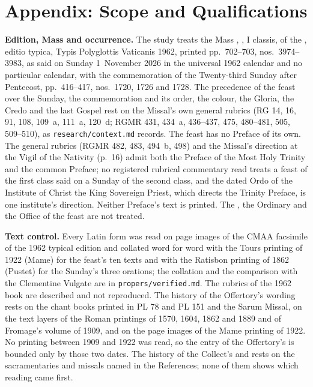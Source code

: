 \section{Appendix: Scope and Qualifications}
\label{sec:scope}

{\small
\textbf{Edition, Mass and occurrence.} The study treats the Mass
, , I classis, of the
, editio typica, Typis Polyglottis Vaticanis 1962,
printed pp.~702--703, nos.~3974--3983, as said on Sunday 1~November 2026 in
the universal 1962 calendar and no particular calendar, with the commemoration
of the Twenty-third Sunday after Pentecost, pp.~416--417, nos.~1720, 1726 and
1728. The precedence of the feast over the Sunday, the commemoration and its
order, the colour, the Gloria, the Credo and the last Gospel rest on the
Missal's own general rubrics (RG 14, 16, 91, 108, 109~a, 111~a, 120~d; RGMR
431, 434~a, 436--437, 475, 480--481, 505, 509--510), as
\texttt{research/context.md} records. The feast has no Preface of its own. The
general rubrics (RGMR 482, 483, 494~b, 498) and the Missal's direction at the
Vigil of the Nativity (p.~16) admit both the Preface of the Most Holy Trinity
and the common Preface; no registered rubrical commentary read treats a feast
of the first class said on a Sunday of the second class, and the dated Ordo of
the Institute of Christ the King Sovereign Priest, which directs the Trinity
Preface, is one institute's direction. Neither Preface's text is printed. The
, the Ordinary and the Office of the feast are not treated.

\textbf{Text control.} Every Latin form was read on page images of the CMAA
facsimile of the 1962 typical edition and collated word for word with the
Tours printing of 1922 (Mame) for the feast's ten texts and with the Ratisbon
printing of 1862 (Pustet) for the Sunday's three orations; the collation and
the comparison with the Clementine Vulgate are in
\texttt{propers/verified.md}. The rubrics of the 1962 book are described and
not reproduced. The history of the Offertory's wording rests on the chant
books printed in PL 78 and PL 151 and the Sarum Missal, on the text layers of
the Roman printings of 1570, 1604, 1862 and 1889 and of Fromage's volume of
1909, and on the page images of the Mame printing of 1922. No printing between
1909 and 1922 was read, so the entry of the Offertory's  is
bounded only by those two dates. The history of the Collect's
 and  rests on the sacramentaries
and missals named in the References; none of them shows which reading came
first.

}
